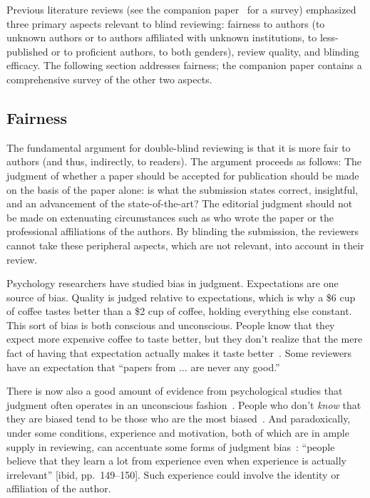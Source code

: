 \documentclass[acmtods,acmnow]{acmtrans2m}
\begin{document}
Previous literature reviews (see the companion paper~\cite{DBR} for a survey)
emphasized three primary aspects relevant to blind reviewing: fairness to
authors (to unknown authors or to authors affiliated with unknown
institutions, to less-published or to proficient authors, to both genders),
review quality, and blinding efficacy. The following section addresses
fairness; the companion paper contains a comprehensive survey of the other
two aspects.

\subsection{Fairness}\label{sec:fairness}
The fundamental argument for double-blind reviewing is that it is more fair to
authors (and thus, indirectly, to readers). The argument proceeds as
follows: The judgment of whether a paper should be accepted for publication
should be made on the basis of the paper alone: is what the submission
states correct, insightful, and an advancement of the state-of-the-art? The
editorial judgment should not be made on extenuating circumstances such as
who wrote the paper or the professional affiliations of the authors. By
blinding the submission, the reviewers cannot take these peripheral aspects,
which are not relevant, into account in their review.

Psychology researchers have studied bias in judgment.
Expectations are one source of bias. Quality is judged relative to
expectations, which is why a \$6 cup of coffee tastes better than a \$2 cup
of coffee, holding everything else constant. This sort of bias is both
conscious and unconscious. People know that they expect more expensive
coffee to taste better, but they don't realize that the mere fact of having
that expectation actually makes it taste better~\cite{shiv05}. Some
reviewers have an expectation that ``papers from $\ldots$ are never any
good.''

There is now also a good amount of evidence from psychological
studies that judgment often operates in an unconscious
fashion~\cite{greenwald95}. People who don't {\em know} that they are biased
tend to be those who are the most biased~\cite{wilson94}. And paradoxically,
under some conditions, experience and motivation, both of which are in ample
supply in reviewing, can accentuate some forms of judgment
bias~\cite{kardes05}: ``people believe that they learn a lot from experience
even when experience is actually irrelevant'' [ibid, pp.~149--150]. Such
experience could involve the identity or affiliation of the author.
\end{document}
